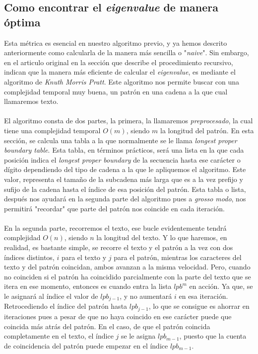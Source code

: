 \subsection{Como encontrar el \textit{eigenvalue} de manera óptima}
Esta métrica es esencial en nuestro algoritmo previo, y ya hemos descrito anteriormente como calcularla de la manera más sencilla o "\textit{naive}". Sin embargo, en el articulo original \cite{limniotis2007nonlinear} en la sección que describe el procedimiento recursivo, indican que la manera más eficiente de calcular el \textit{eigenvalue}, es mediante el algoritmo de \textit{Knuth Morris Pratt}. Este algoritmo nos permite buscar con una complejidad temporal muy buena, un patrón en una cadena a la que cual llamaremos texto. \\\\
El algoritmo consta de dos partes, la primera, la llamaremos \textit{preprocesado}, la cual tiene una complejidad temporal $O(m)$, siendo $m$ la longitud del patrón. En esta sección, se calcula una tabla a la que normalmente se le llama \textit{longest proper boundary table}. Esta tabla, en términos prácticos, será una lista en la que cada posición indica el \textit{longest proper boundary} de la secuencia hasta ese carácter o dígito dependiendo del tipo de cadena a la que le apliquemos el algoritmo. Este valor, representa el tamaño de la subcadena más larga que es a la vez prefijo y sufijo de la cadena hasta el índice de esa posición del patrón. Esta tabla o lista, después nos ayudará en la segunda parte del algoritmo pues a \textit{grosso modo}, nos permitirá "recordar" que parte del patrón nos coincide en cada iteración.\\\\
En la segunda parte, recorremos el texto, ese bucle evidentemente tendrá complejidad $O(n)$, siendo $n$ la longitud del texto. Y lo que haremos, en realidad, es bastante simple, se recorre el texto y el patrón a la vez con dos índices distintos, $i$ para el texto y $j$ para el patrón, mientras los caracteres del texto y del patrón coincidan, ambos avanzan a la misma velocidad. Pero, cuando no coinciden si el patrón ha coincidido parcialmente con la parte del texto que se itera en ese momento, entonces es cuando entra la lista $lpb^m$ en acción. Ya que, se le asignará al índice el valor de $lpb_{j - 1}$, y  no aumentará $i$ en esa iteración. Retrocediendo el índice del patrón hasta $lpb_{j-1}$, lo que se consigue es ahorrar en iteraciones pues a pesar de que no haya coincido en ese carácter puede que coincida más atrás del patrón. En el caso, de que el patrón coincida completamente en el texto, el índice $j$ se le asigna $lpb_{m-1}$, puesto que la cuenta de coincidencia del patrón puede empezar en el índice $lpb_{m-1}$.\\\\
